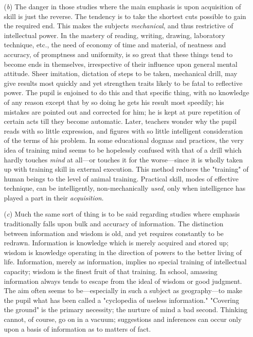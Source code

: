 \documentclass[letterpaper]{book}
\begin{document}


(\emph{b}) The danger in those studies where the main emphasis is upon
acquisition of skill is just the reverse. The tendency is to take the
shortest cuts possible to gain the required end. This makes the subjects
\emph{mechanical}, and thus restrictive of intellectual power. In the
mastery of reading, writing, drawing, laboratory technique, etc., the
need of economy of time and material, of neatness and accuracy, of
promptness and uniformity, is so great that these things tend to become
ends in themselves, irrespective of their influence upon general mental
attitude. Sheer imitation, dictation of steps to be taken, mechanical
drill, may give results most quickly and yet strengthen traits likely to
be fatal to reflective power. The pupil is enjoined to do this and that
specific thing, with no knowledge of any reason except that by so doing
he gets his result most speedily; his mistakes are pointed out and
corrected for him; he is kept at pure repetition of certain acts till
they become automatic. Later, teachers wonder why the pupil reads with
so little expression, and figures with so little intelligent
consideration of the
terms
of his problem. In some educational dogmas and practices, the very idea
of training mind seems to be hopelessly confused with that of a drill
which hardly touches \emph{mind} at all---or touches it for the
worse---since it is wholly taken up with training skill in external
execution. This method reduces the "training" of human beings to the
level of animal training. Practical skill, modes of effective technique,
can be intelligently, non-mechanically \emph{used}, only when
intelligence has played a part in their \emph{acquisition}.


(\emph{c}) Much the same sort of thing is to be said regarding studies
where emphasis traditionally falls upon bulk and accuracy of
information. The distinction between information and wisdom is old, and
yet requires constantly to be redrawn. Information is knowledge which is
merely acquired and stored up; wisdom is knowledge operating in the
direction of powers to the better living of life. Information, merely as
information, implies no special training of intellectual capacity;
wisdom is the finest fruit of that training. In school, amassing
information always tends to escape from the ideal of wisdom or good
judgment. The aim often seems to be---especially in such a subject as
geography---to make the pupil what has been called a "cyclopedia of
useless information." "Covering the ground" is the primary necessity;
the nurture of mind a bad second. Thinking cannot, of course, go on in a
vacuum; suggestions and inferences can occur only upon a basis of
information as to matters of fact.
\end{document}
